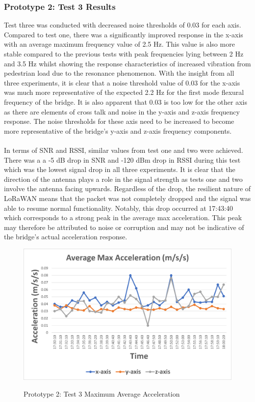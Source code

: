 \subsubsection{Prototype 2: Test 3 Results}
Test three was conducted with decreased noise thresholds of 0.03 for each axis. Compared to test one, there was a significantly improved response in the x-axis with an average maximum frequency value of 2.5 Hz. This value is also more stable compared to the previous tests with peak frequencies lying between 2 Hz and 3.5 Hz whilst showing the response characteristics of increased vibration from pedestrian load due to the resonance phenomenon. With the insight from all three experiments, it is clear that a noise threshold value of 0.03 for the x-axis was much more representative of the expected 2.2 Hz for the first mode flexural frequency of the bridge. It is also apparent that 0.03 is too low for the other axis as there are elements of cross talk and noise in the y-axis and z-axis frequency response. The noise thresholds for these axis need to be increased to become more representative of the bridge's y-axis and z-axis frequency components.\\\\
In terms of SNR and RSSI, similar values from test one and two were achieved. There was a a -5 dB drop in SNR and -120 dBm drop in RSSI during this test which was the lowest signal drop in all three experiments. It is clear that the direction of the antenna plays a role in the signal strength as tests one and two involve the antenna facing upwards. Regardless of the drop, the resilient nature of LoRaWAN means that the packet was not completely dropped and the signal was able to resume normal functionality. Notably, this drop occurred at 17:43:40 which corresponds to a strong peak in the average max acceleration. This peak may therefore be attributed to noise or corruption and may not be indicative of the bridge's actual acceleration response. 

\begin{figure}[H]
	\centering
	\caption{Prototype 2: Test 3 Maximum Average Acceleration}
	\includegraphics[width=\textwidth]{Sections/Prototype-Testing/proto2-test3-a.png}
	\label{proto2-test3-a}
\end{figure}

